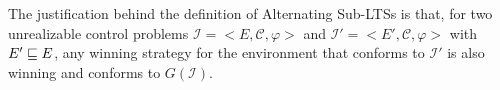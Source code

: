The justification behind the definition of Alternating Sub-LTSs is that, for two unrealizable control problems $\mathcal{I} = <E, \mathcal{C}, \varphi>$ and $\mathcal{I'} = <E', \mathcal{C}, \varphi>$ with $E' \sqsubseteq E$, any winning strategy for the environment that conforms to $\mathcal{I'}$ is also winning and conforms to $G(\mathcal{I})$.

%
%
%

